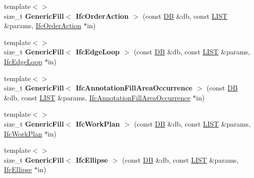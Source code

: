 \begin{DoxyCompactItemize}
\item 
\hypertarget{namespace_assimp_1_1_s_t_e_p_a191bebe3e70bb945db67d21d6a6f983c}{{\footnotesize template$<$$>$ }\\size\+\_\+t {\bfseries Generic\+Fill$<$ Ifc\+Order\+Action $>$} (const \hyperlink{class_assimp_1_1_s_t_e_p_1_1_d_b}{D\+B} \&db, const \hyperlink{class_assimp_1_1_s_t_e_p_1_1_e_x_p_r_e_s_s_1_1_l_i_s_t}{L\+I\+S\+T} \&params, \hyperlink{struct_assimp_1_1_i_f_c_1_1_ifc_order_action}{Ifc\+Order\+Action} $\ast$in)}\label{namespace_assimp_1_1_s_t_e_p_a191bebe3e70bb945db67d21d6a6f983c}

\item 
\hypertarget{namespace_assimp_1_1_s_t_e_p_ac42e6232d6a70290e8af93c22d46d0e8}{{\footnotesize template$<$$>$ }\\size\+\_\+t {\bfseries Generic\+Fill$<$ Ifc\+Edge\+Loop $>$} (const \hyperlink{class_assimp_1_1_s_t_e_p_1_1_d_b}{D\+B} \&db, const \hyperlink{class_assimp_1_1_s_t_e_p_1_1_e_x_p_r_e_s_s_1_1_l_i_s_t}{L\+I\+S\+T} \&params, \hyperlink{struct_assimp_1_1_i_f_c_1_1_ifc_edge_loop}{Ifc\+Edge\+Loop} $\ast$in)}\label{namespace_assimp_1_1_s_t_e_p_ac42e6232d6a70290e8af93c22d46d0e8}

\item 
\hypertarget{namespace_assimp_1_1_s_t_e_p_a00cbd074aef5583313124b5fc7d70ce2}{{\footnotesize template$<$$>$ }\\size\+\_\+t {\bfseries Generic\+Fill$<$ Ifc\+Annotation\+Fill\+Area\+Occurrence $>$} (const \hyperlink{class_assimp_1_1_s_t_e_p_1_1_d_b}{D\+B} \&db, const \hyperlink{class_assimp_1_1_s_t_e_p_1_1_e_x_p_r_e_s_s_1_1_l_i_s_t}{L\+I\+S\+T} \&params, \hyperlink{struct_assimp_1_1_i_f_c_1_1_ifc_annotation_fill_area_occurrence}{Ifc\+Annotation\+Fill\+Area\+Occurrence} $\ast$in)}\label{namespace_assimp_1_1_s_t_e_p_a00cbd074aef5583313124b5fc7d70ce2}

\item 
\hypertarget{namespace_assimp_1_1_s_t_e_p_a31f1000fe7b6f255158b890d56351ca6}{{\footnotesize template$<$$>$ }\\size\+\_\+t {\bfseries Generic\+Fill$<$ Ifc\+Work\+Plan $>$} (const \hyperlink{class_assimp_1_1_s_t_e_p_1_1_d_b}{D\+B} \&db, const \hyperlink{class_assimp_1_1_s_t_e_p_1_1_e_x_p_r_e_s_s_1_1_l_i_s_t}{L\+I\+S\+T} \&params, \hyperlink{struct_assimp_1_1_i_f_c_1_1_ifc_work_plan}{Ifc\+Work\+Plan} $\ast$in)}\label{namespace_assimp_1_1_s_t_e_p_a31f1000fe7b6f255158b890d56351ca6}

\item 
\hypertarget{namespace_assimp_1_1_s_t_e_p_afa9ebd8b3a871e217f43623262363c9f}{{\footnotesize template$<$$>$ }\\size\+\_\+t {\bfseries Generic\+Fill$<$ Ifc\+Ellipse $>$} (const \hyperlink{class_assimp_1_1_s_t_e_p_1_1_d_b}{D\+B} \&db, const \hyperlink{class_assimp_1_1_s_t_e_p_1_1_e_x_p_r_e_s_s_1_1_l_i_s_t}{L\+I\+S\+T} \&params, \hyperlink{struct_assimp_1_1_i_f_c_1_1_ifc_ellipse}{Ifc\+Ellipse} $\ast$in)}\label{namespace_assimp_1_1_s_t_e_p_afa9ebd8b3a871e217f43623262363c9f}


\end{DoxyCompactItemize}
